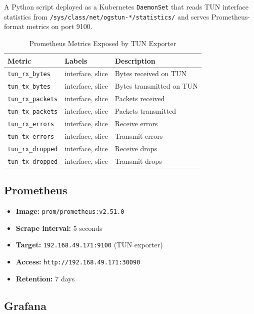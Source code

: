 \documentclass[12pt,a4paper]{article}
\begin{document}
A Python script deployed as a Kubernetes \texttt{DaemonSet} that reads TUN interface statistics from \texttt{/sys/class/net/ogstun-*/statistics/} and serves Prometheus-format metrics on port 9100.

\begin{table}[H]
\centering
\begin{tabular}{lll}
\toprule
\textbf{Metric} & \textbf{Labels} & \textbf{Description} \\
\midrule
\texttt{tun\_rx\_bytes}   & interface, slice & Bytes received on TUN \\
\texttt{tun\_tx\_bytes}   & interface, slice & Bytes transmitted on TUN \\
\texttt{tun\_rx\_packets} & interface, slice & Packets received \\
\texttt{tun\_tx\_packets} & interface, slice & Packets transmitted \\
\texttt{tun\_rx\_errors}  & interface, slice & Receive errors \\
\texttt{tun\_tx\_errors}  & interface, slice & Transmit errors \\
\texttt{tun\_rx\_dropped} & interface, slice & Receive drops \\
\texttt{tun\_tx\_dropped} & interface, slice & Transmit drops \\
\bottomrule
\end{tabular}
\caption{Prometheus Metrics Exposed by TUN Exporter}
\end{table}

\subsection{Prometheus}

\begin{itemize}
    \item \textbf{Image:} \texttt{prom/prometheus:v2.51.0}
    \item \textbf{Scrape interval:} 5 seconds
    \item \textbf{Target:} \texttt{192.168.49.171:9100} (TUN exporter)
    \item \textbf{Access:} \texttt{http://192.168.49.171:30090}
    \item \textbf{Retention:} 7 days
\end{itemize}

\subsection{Grafana}
\end{document}
